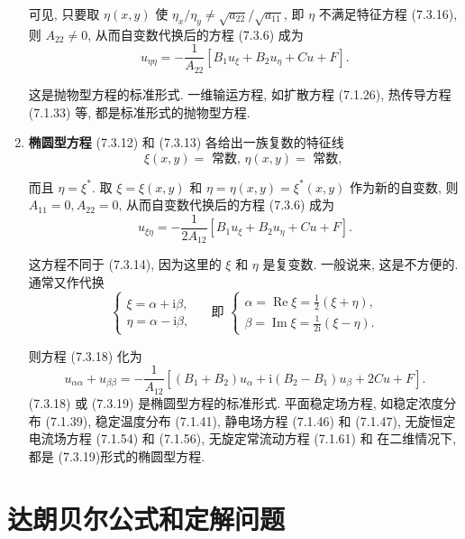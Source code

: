 \begin{enumerate}
可见, 只要取 $\eta(x, y)$ 使 $\eta_x / \eta_y \neq \sqrt{a_{22}} / \sqrt{a_{11}}$, 即 $\eta$ 不满足特征方程 (7.3.16), 则 $A_{22} \neq 0$, 从而自变数代换后的方程 (7.3.6) 成为
$$
u_{\eta \eta}=-\frac{1}{A_{22}}\left[B_1 u_{\xi}+B_2 u_\eta+C u+F\right] .
$$

这是抛物型方程的标准形式. 一维输运方程, 如扩散方程 (7.1.26), 热传导方程 (7.1.33) 等, 都是标准形式的抛物型方程.


\item \textbf{椭圆型方程}
(7.3.12) 和 (7.3.13) 各给出一族复数的特征线
$$
\xi(x, y)=\text { 常数, } \eta(x, y)=\text { 常数, }
$$

而且 $\eta=\xi^*$. 取 $\xi=\xi(x, y)$ 和 $\eta=\eta(x, y)=\xi^*(x, y)$ 作为新的自变数, 则 $A_{11}=0, A_{22}=0$, 从而自变数代换后的方程 (7.3.6) 成为
$$
u_{\xi \eta}=-\frac{1}{2 A_{12}}\left[B_1 u_{\xi}+B_2 u_\eta+C u+F\right] .
$$

这方程不同于 (7.3.14), 因为这里的 $\xi$ 和 $\eta$ 是复变数. 一般说来, 这是不方便的. 通常又作代换
$$
\left\{\begin{array} { l } 
{ \xi = \alpha + \mathrm { i } \beta , } \\
{ \eta = \alpha - \mathrm { i } \beta , }
\end{array} \quad \text { 即 } \left\{\begin{array}{l}
\alpha=\operatorname{Re} \xi=\frac{1}{2}(\xi+\eta), \\
\beta=\operatorname{Im} \xi=\frac{1}{2 \mathrm{i}}(\xi-\eta) .
\end{array}\right.\right.
$$

则方程 (7.3.18) 化为
$$
u_{\alpha \alpha}+u_{\beta \beta}=-\frac{1}{A_{12}}\left[\left(B_1+B_2\right) u_\alpha+\mathrm{i}\left(B_2-B_1\right) u_\beta+2 C u+F\right] .
$$
(7.3.18) 或 (7.3.19) 是椭圆型方程的标准形式. 平面稳定场方程, 如稳定浓度分布 (7.1.39), 稳定温度分布 (7.1.41), 静电场方程 (7.1.46) 和 (7.1.47), 无旋恒定电流场方程 (7.1.54) 和 (7.1.56), 无旋定常流动方程 (7.1.61) 和
在二维情况下, 都是 (7.3.19)形式的椭圆型方程.
\end{enumerate}


\section{达朗贝尔公式和定解问题}
